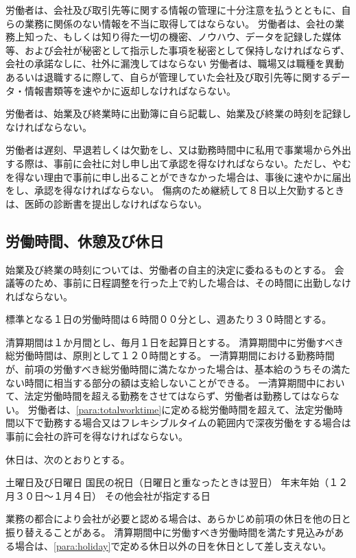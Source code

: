 \documentclass[10pt,a4paper,uplatex]{jsarticle}
\begin{document}
労働者は、会社及び取引先等に関する情報の管理に十分注意を払うとともに、自らの業務に関係のない情報を不当に取得してはならない。
\label{para:confidentiality}
\term
労働者は、会社の業務上知った、もしくは知り得た一切の機密、ノウハウ、データを記録した媒体等、および会社が秘密として指示した事項を秘密として保持しなければならず、会社の承諾なしに、社外に漏洩してはならない
\term
労働者は、職場又は職種を異動あるいは退職するに際して、自らが管理していた会社及び取引先等に関するデータ・情報書類等を速やかに返却しなければならない。

労働者は、始業及び終業時に出勤簿に自ら記載し、始業及び終業の時刻を記録しなければならない。

労働者は遅刻、早退若しくは欠勤をし、又は勤務時間中に私用で事業場から外出する際は、事前に会社に対し申し出て承認を得なければならない。ただし、やむを得ない理由で事前に申し出ることができなかった場合は、事後に速やかに届出をし、承認を得なければならない。
\term
傷病のため継続して８日以上欠勤するときは、医師の診断書を提出しなければならない。




\subsection{労働時間、休憩及び休日}

\label{para:time}
始業及び終業の時刻については、労働者の自主的決定に委ねるものとする。
\term
会議等のため、事前に日程調整を行った上で約した場合は、その時間に出勤しなければならない。

\label{para:standardworktime}
標準となる１日の労働時間は６時間００分とし、週あたり３０時間とする。

清算期間は１か月間とし、毎月１日を起算日とする。
\term
清算期間中に労働すべき総労働時間は、原則として１２０時間とする。
\term
一清算期間における勤務時間が、前項の労働すべき総労働時間に満たなかった場合は、基本給のうちその満たない時間に相当する部分の額は支給しないことができる。
\label{para:totalworktime}
\term
一清算期間中において、法定労働時間を超える勤務をさせてはならず、労働者は勤務してはならない。
\term
労働者は、\ref{para:totalworktime}に定める総労働時間を超えて、法定労働時間以下で勤務する場合又はフレキシブルタイムの範囲内で深夜労働をする場合は事前に会社の許可を得なければならない。

休日は、次のとおりとする。
\label{para:holiday}
\begin{enumerate}
    \itm 土曜日及び日曜日
    \itm 国民の祝日（日曜日と重なったときは翌日）
    \itm 年末年始（１２月３０日～１月４日）
    \itm その他会社が指定する日
\end{enumerate}
\term
業務の都合により会社が必要と認める場合は、あらかじめ前項の休日を他の日と振り替えることがある。
\term
清算期間中に労働すべき労働時間を満たす見込みがある場合は、\ref{para:holiday}で定める休日以外の日を休日として差し支えない。 
\end{document}
